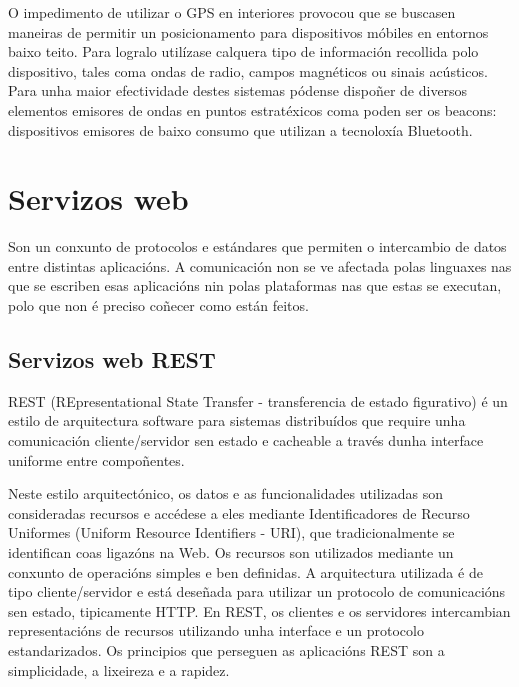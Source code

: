 O impedimento de utilizar o GPS en interiores provocou que se buscasen maneiras de permitir un posicionamento para dispositivos móbiles en entornos baixo teito. Para logralo utilízase calquera tipo de información recollida polo dispositivo, tales coma ondas de radio, campos magnéticos ou sinais acústicos. Para unha maior efectividade destes sistemas pódense dispoñer de diversos elementos emisores de ondas en puntos estratéxicos coma poden ser os beacons: dispositivos emisores de baixo consumo que utilizan a tecnoloxía Bluetooth.


\section{Servizos web}

Son un conxunto de protocolos e estándares que permiten o intercambio de datos entre distintas aplicacións. A comunicación non se ve afectada polas linguaxes nas que se escriben esas aplicacións nin polas plataformas nas que estas se executan, polo que non é preciso coñecer como están feitos.

\subsection{Servizos web REST}

REST (REpresentational State Transfer - transferencia de estado figurativo) é un estilo de arquitectura software para sistemas distribuídos que require unha comunicación cliente/servidor sen estado e cacheable a través dunha interface uniforme entre compoñentes.

Neste estilo arquitectónico, os datos e as funcionalidades utilizadas son consideradas recursos e accédese a eles mediante Identificadores de Recurso Uniformes (Uniform Resource Identifiers - URI), que tradicionalmente se identifican coas ligazóns na Web. Os recursos son utilizados mediante un conxunto de operacións simples e ben definidas. A arquitectura utilizada é de tipo cliente/servidor e está deseñada para utilizar un protocolo de comunicacións sen estado, tipicamente HTTP. En REST, os clientes e os servidores intercambian representacións de recursos utilizando unha interface e un protocolo estandarizados. Os principios que perseguen as aplicacións REST son a simplicidade, a lixeireza e a rapidez.